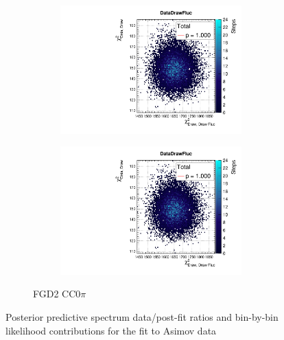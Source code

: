 \begin{figure}[h]
\begin{subfigure}[t]{\textwidth}
\begin{subfigure}[t]{0.49\textwidth}
	\includegraphics[width=\textwidth, trim={0mm 10mm 0mm 11mm}, clip,page=23]{figures/mach3/Asimov/2017b_NewDet_3Xsec_4Det_5Flux_NewXSecTune_Asimov_merge_PostPred_procs}
\end{subfigure}
\begin{subfigure}[t]{0.49\textwidth}
	\includegraphics[width=\textwidth, trim={0mm 10mm 0mm 11mm}, clip,page=25]{figures/mach3/Asimov/2017b_NewDet_3Xsec_4Det_5Flux_NewXSecTune_Asimov_merge_PostPred_procs}
\end{subfigure}
\caption{FGD2 CC0$\pi$}
\end{subfigure}
	\caption{Posterior predictive \pmu \cosmu spectrum data/post-fit ratios and bin-by-bin likelihood contributions for the fit to Asimov data}
	\label{fig:posterior_predictive_2d_asimov}
\end{figure}

